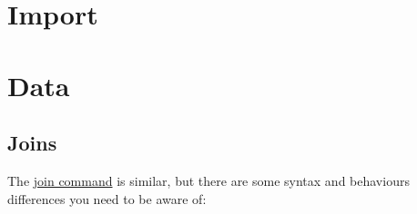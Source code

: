 \documentclass[
]{book}
\begin{document}
\hypertarget{import}{%
\section{Import}\label{import}}

\hypertarget{data}{%
\section{Data}\label{data}}

\hypertarget{joins}{%
\subsection{Joins}\label{joins}}

The \href{https://help.highbond.com/helpdocs/analytics/142/scripting-guide/en-us/Content/lang_ref/commands/r_join.htm}{join command} is similar, but there are some syntax and behaviours differences you need to be aware of:
\end{document}
